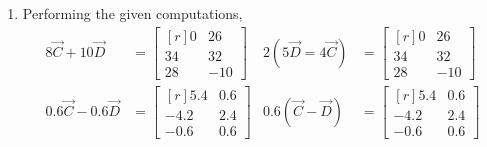 \begin{enumerate}
    \item Performing the given computations,
          \begin{align}
              8\vec{C} + 10\vec{D}    & = \begin{bmatrix*}[r]
                                              0  & 26  \\
                                              34 & 32  \\
                                              28 & -10
                                          \end{bmatrix*} &
              2 (5\vec{D} = 4\vec{C}) & = \begin{bmatrix*}[r]
                                              0  & 26  \\
                                              34 & 32  \\
                                              28 & -10
                                          \end{bmatrix*} \\
              0.6\vec{C} - 0.6\vec{D} & = \begin{bmatrix*}[r]
                                              5.4  & 0.6 \\
                                              -4.2 & 2.4 \\
                                              -0.6 & 0.6
                                          \end{bmatrix*} &
              0.6(\vec{C} - \vec{D})  & = \begin{bmatrix*}[r]
                                              5.4  & 0.6 \\
                                              -4.2 & 2.4 \\
                                              -0.6 & 0.6
                                          \end{bmatrix*}
          \end{align}


\end{enumerate}

